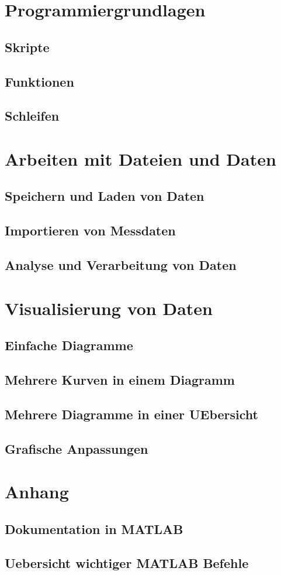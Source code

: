 \documentclass[12pt, a4paper, twoside]{article}
\begin{document}
    \section{Programmiergrundlagen}
        \subsection{Skripte}
        \subsection{Funktionen}
        \subsection{Schleifen}
    \section{Arbeiten mit Dateien und Daten}
        \subsection{Speichern und Laden von Daten}
        \subsection{Importieren von Messdaten}
        \subsection{Analyse und Verarbeitung von Daten}
    \section{Visualisierung von Daten}
        \subsection{Einfache Diagramme}
        \subsection{Mehrere Kurven in einem Diagramm}
        \subsection{Mehrere Diagramme in einer UEbersicht}
        \subsection{Grafische Anpassungen}
    \section{Anhang}
        \subsection{Dokumentation in MATLAB}
        \subsection{Uebersicht wichtiger MATLAB Befehle}
\end{document}
